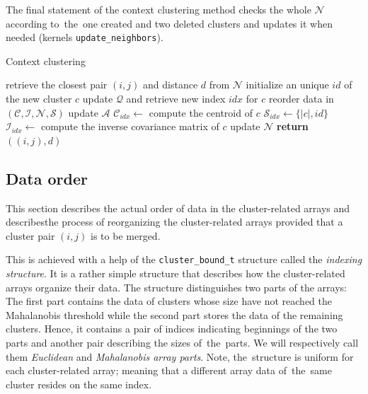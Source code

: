 \begin{description}
	The final statement of the context clustering method checks the whole $\mathcal{N}$  according to~the~one created and two deleted clusters and updates it when needed (kernels \texttt{update\_neighbors}).
	
	\begin{algorithm}[t]
	\caption{Context clustering}
	\label{alg03:context}
	\begin{algorithmic}[1]
		\State retrieve the closest pair $(i,j)$ and distance $d$ from $\mathcal{N}$
		\State initialize an unique $id$ of the new cluster $c$
		\State update $\mathcal{Q}$ and retrieve new index $idx$ for $c$
		\State reorder data in $(\mathcal{C},\mathcal{I},\mathcal{N},\mathcal{S})$
		\State update $\mathcal{A}$
		\State $\mathcal{C}_{idx} \gets$ compute the centroid of $c$
		\State $\mathcal{S}_{idx} \gets \{|c|, id\}$
		\State $\mathcal{I}_{idx} \gets$ compute the inverse covariance matrix of $c$
		\EndIf
		\State update $\mathcal{N}$
		\State \textbf{return} $((i,j),d)$
		\EndProcedure
	\end{algorithmic}
\end{algorithm}

\end{description}


\subsection{Data order}

This section describes the actual order of data in the cluster-related arrays and describesthe process of reorganizing the cluster-related arrays provided that a cluster pair $(i,j)$ is to be merged.

This is achieved with a help of the \texttt{cluster\_bound\_t} structure called the \emph{indexing structure}. It is a rather simple structure that describes how the cluster-related arrays organize their data. The structure distinguishes two parts of the arrays: The first part contains the data of clusters whose size have not reached the Mahalanobis threshold while the second part stores the data of the remaining clusters. Hence, it contains a pair of indices indicating beginnings of the two parts and another pair describing the sizes of~the~parts. We will respectively call them \emph{Euclidean} and \emph{Mahalanobis array parts}. Note, the~structure is uniform for each cluster-related array; meaning that a different array data of~the~same cluster resides on the same index.

